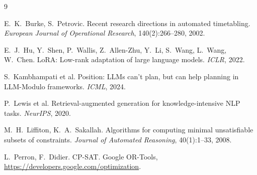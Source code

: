 \documentclass[11pt,a4paper]{article}
\begin{document}
\begin{thebibliography}{9}
\small
\setlength{\itemsep}{2pt}

 E.~K.~Burke, S.~Petrovic. Recent research directions in automated timetabling.
\emph{European Journal of Operational Research}, 140(2):266--280, 2002.

 E.~J.~Hu, Y.~Shen, P.~Wallis, Z.~Allen-Zhu, Y.~Li, S.~Wang, L.~Wang, W.~Chen. LoRA: Low-rank
adaptation of large language models. \emph{ICLR}, 2022.

 S.~Kambhampati et al. Position: LLMs can't plan, but can help planning in LLM-Modulo
frameworks. \emph{ICML}, 2024.

 P.~Lewis et al. Retrieval-augmented generation for knowledge-intensive NLP tasks.
\emph{NeurIPS}, 2020.

 M.~H.~Liffiton, K.~A.~Sakallah. Algorithms for computing minimal unsatisfiable subsets of
constraints. \emph{Journal of Automated Reasoning}, 40(1):1--33, 2008.

 L.~Perron, F.~Didier. CP-SAT. Google OR-Tools, \url{https://developers.google.com/optimization}.

\end{thebibliography}
\end{document}

